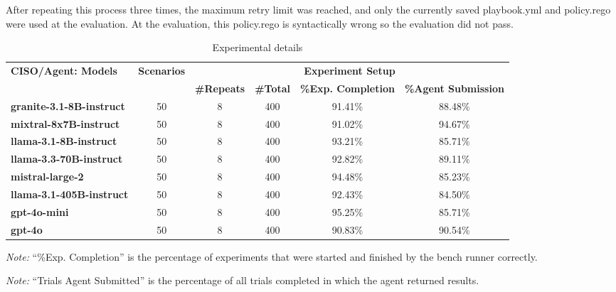 \vspace{1em}

After repeating this process three times, the maximum retry limit was reached, and only the currently saved playbook.yml and policy.rego were used at the evaluation. At the evaluation, this policy.rego is syntactically wrong so the evaluation did not pass.


\begin{table*}[htp]
\small
\centering
\begin{threeparttable}
\caption{Experimental details}
\label{tab:exp-setup-ciso}
\begin{tabular}{@{}l c c c c c@{}}
\toprule
\multirow{2}{*}{\textbf{CISO/Agent: Models}} 
 & \multirow{2}{*}{\textbf{Scenarios}}
 & \multicolumn{4}{c}{\textbf{Experiment Setup}} \\
\cmidrule(lr){3-6}
 & 
 & \textbf{\#Repeats} 
 & \textbf{\#Total} 
 & \textbf{\%Exp. Completion}
 & \textbf{\%Agent Submission}\\
\midrule
\textbf{granite-3.1-8B-instruct}           & 50 & 8 & 400 & 91.41\% & 88.48\% \\
\textbf{mixtral-8x7B-instruct}           & 50 & 8 & 400 & 91.02\% & 94.67\% \\
\textbf{llama-3.1-8B-instruct}   & 50 & 8 & 400 & 93.21\% & 85.71\% \\
\textbf{llama-3.3-70B-instruct} & 50 & 8 & 400 & 92.82\% & 89.11\% \\
\textbf{mistral-large-2}           & 50 & 8 & 400 & 94.48\% & 85.23\% \\
\textbf{llama-3.1-405B-instruct}                & 50 & 8 & 400 & 92.43\% & 84.50\% \\
\textbf{gpt-4o-mini}                       & 50 & 8 & 400 & 95.25\% & 85.71\% \\
\textbf{gpt-4o}                       & 50 & 8 & 400 & 90.83\% & 90.54\% \\
\bottomrule
\end{tabular}
\begin{tablenotes}
\footnotesize
\item \textit{Note:} “\%Exp. Completion” is the percentage of experiments that were started and finished by the bench runner correctly. \\
\item \textit{Note:} “Trials Agent Submitted” is the percentage of all trials completed in which the agent returned results.\\
\end{tablenotes}
\end{threeparttable}
\end{table*}




